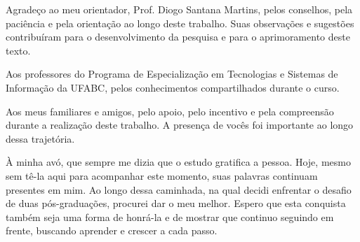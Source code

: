 \begin{agradecimentos}


Agradeço ao meu orientador, Prof. Diogo Santana Martins, pelos conselhos, pela paciência e pela orientação ao longo deste trabalho. Suas observações e sugestões contribuíram para o desenvolvimento da pesquisa e para o aprimoramento deste texto.

Aos professores do Programa de Especialização em Tecnologias e Sistemas de Informação da UFABC, pelos conhecimentos compartilhados durante o curso.

Aos meus familiares e amigos, pelo apoio, pelo incentivo e pela compreensão durante a realização deste trabalho. A presença de vocês foi importante ao longo dessa trajetória.

À minha avó, que sempre me dizia que o estudo gratifica a pessoa. Hoje, mesmo sem tê-la aqui para acompanhar este momento, suas palavras continuam presentes em mim. Ao longo dessa caminhada, na qual decidi enfrentar o desafio de duas pós-graduações, procurei dar o meu melhor. Espero que esta conquista também seja uma forma de honrá-la e de mostrar que continuo seguindo em frente, buscando aprender e crescer a cada passo.


\end{agradecimentos}
